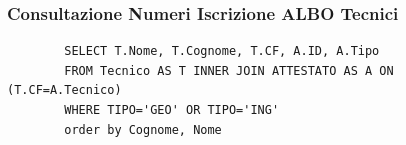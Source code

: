 \documentclass{elegantbook}
\begin{document}
\subsubsection{Consultazione Numeri Iscrizione ALBO Tecnici}
	\begin{verbatim}
		SELECT T.Nome, T.Cognome, T.CF, A.ID, A.Tipo
		FROM Tecnico AS T INNER JOIN ATTESTATO AS A ON (T.CF=A.Tecnico)
		WHERE TIPO='GEO' OR TIPO='ING'
		order by Cognome, Nome
	\end{verbatim}
\begin{figure}[H]
	\centering
\end{figure}
\end{document}
